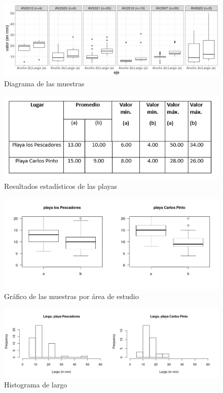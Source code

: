 \documentclass[11pt,]{article}
\begin{document}
\begin{figure}
\centering
\includegraphics{muestra_graf.png}
\caption{Diagrama de las muestras\label{grafico}}
\end{figure}

\begin{figure}
\centering
\includegraphics{tabla_lugar.png}
\caption{Resultados estadísticos de las playas \label{lugar}}
\end{figure}

\begin{figure}
\centering
\includegraphics{diagrama.png}
\caption{Gráfico de las muestras por área de estudio\label{grafplaya}}
\end{figure}

\begin{figure}
\centering
\includegraphics{largo_hist.png}
\caption{Histograma de largo\label{largo}}
\end{figure}
\end{document}
